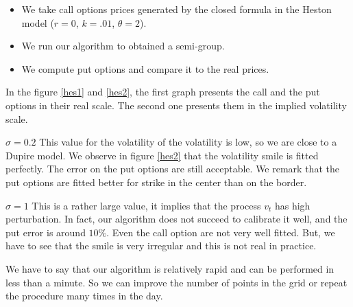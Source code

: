 \documentclass[a4paper]{article}
\begin{document}
\begin{itemize}
  \item We take call options prices generated by the closed
  formula in the Heston model ($r=0$, $k=.01$, $\theta=2$).
  \item We run our algorithm to obtained a semi-group.
  \item We compute put options and compare it to the real prices.
\end{itemize}

In the figure \ref{hes1} and \ref{hes2}, the first graph presents
the call and the put options in their real scale. The second one
presents them in the implied volatility scale.

{\bf $\sigma=0.2$} This value for the volatility of the
volatility is low, so we are close to a Dupire model. We observe
in figure \ref{hes2} that the volatility smile is fitted
perfectly. The error on the put options are still acceptable. We
remark that the put options are fitted better for strike in the
center than on the border.

{\bf $\sigma=1$}  This is a rather large value, it implies that
the process $v_t$ has high perturbation. In fact, our algorithm
does not succeed to calibrate it well, and the put error is around
$10\%$. Even the call option are not very well fitted. But, we
have to see that the smile is very irregular and this is not real
in practice.

We have to say that our algorithm is relatively rapid and can be
performed in less than a minute. So we can improve the number of
points in the grid or repeat the procedure many times in the day.

\nocite{ave:amf:97,lag:jcf:97,jac:jcf:98,col:jcf:99,bcv:inria:02,DK}

\newpage
 
\end{document}
